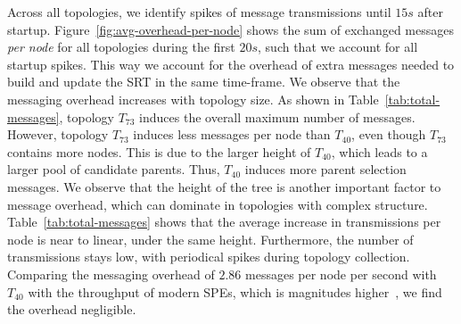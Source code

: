 Across all topologies, we identify spikes of message transmissions until $15s$ after startup. Figure~\ref{fig:avg-overhead-per-node} shows the sum of exchanged messages \textit{per node} for all topologies during the first $20s$, such that we account for all startup spikes. This way we account for the overhead of extra messages needed to build and update the SRT in the same time-frame.
We observe that the messaging overhead increases with topology size. 
As shown in Table~\ref{tab:total-messages}, topology $T_{73}$ induces the overall maximum number of messages.
However, topology $T_{73}$ induces less messages per node than $T_{40}$, even though $T_{73}$ contains more nodes.  This is due to the larger height of $T_{40}$, which leads to a larger pool of candidate parents. Thus, $T_{40}$ induces more parent selection messages. We observe that the height of the tree is another important factor to message overhead, which can dominate in topologies with complex structure. 
Table~\ref{tab:total-messages} shows that the average increase in transmissions per node is near to linear, under the same height.
Furthermore, the number of transmissions stays low, with periodical spikes during topology collection. Comparing the messaging overhead of $2.86$ messages per node per second with $T_{40}$ with the throughput of modern SPEs, which is magnitudes higher~\cite{zeuch2019analyzing}, we find the overhead negligible.

